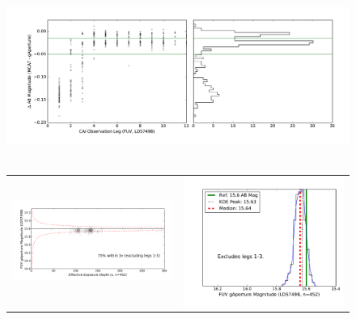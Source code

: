 \documentclass[preprint]{aastex}
\begin{document}
\clearpage
\begin{figure}[h]
\includegraphics[scale=0.5]{Fig09a.pdf}\\\\
\begin{tabular}{cc}
\includegraphics[scale=0.37]{Fig09b.pdf}&
\includegraphics[scale=0.37]{Fig09c.pdf}\\
\end{tabular}

\end{figure}
\end{document}

